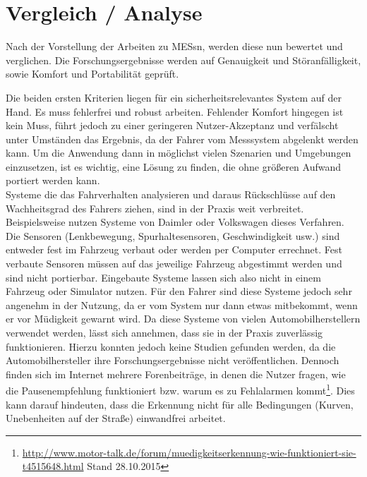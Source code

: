 {\section{Vergleich / Analyse}
\label{chap:an}
Nach der Vorstellung der Arbeiten zu \acl{MESs}n, werden diese nun bewertet und verglichen. Die Forschungsergebnisse werden auf Genauigkeit und Störanfälligkeit, sowie Komfort und Portabilität geprüft. 

Die beiden ersten Kriterien liegen für ein sicherheitsrelevantes System auf der Hand. Es muss fehlerfrei und robust arbeiten. Fehlender Komfort hingegen ist kein Muss, führt jedoch zu einer geringeren Nutzer-Akzeptanz und verfälscht unter Umständen das Ergebnis, da der Fahrer vom Messsystem abgelenkt werden kann. Um die Anwendung dann in möglichst vielen Szenarien und Umgebungen einzusetzen, ist es wichtig, eine Lösung zu finden, die ohne größeren Aufwand portiert werden kann. \\

Systeme die das Fahrverhalten analysieren und daraus Rückschlüsse auf den Wachheitsgrad des Fahrers ziehen, sind in der Praxis weit verbreitet. Beispielsweise nutzen Systeme von Daimler \cite{Daimler} oder Volkswagen \cite{Bosch} dieses Verfahren. Die Sensoren (Lenkbewegung, Spurhaltesensoren, Geschwindigkeit usw.) sind entweder fest im Fahrzeug verbaut oder werden per Computer errechnet. Fest verbaute Sensoren müssen auf das jeweilige Fahrzeug abgestimmt werden und sind nicht portierbar. Eingebaute Systeme lassen sich also nicht in einem Fahrzeug oder Simulator nutzen. Für den Fahrer sind diese Systeme jedoch sehr angenehm in der Nutzung, da er vom System nur dann etwas mitbekommt, wenn er vor Müdigkeit gewarnt wird. Da diese Systeme von vielen Automobilherstellern verwendet werden, lässt sich annehmen, dass sie in der Praxis zuverlässig funktionieren. Hierzu konnten jedoch keine Studien gefunden werden, da die Automobilhersteller ihre Forschungsergebnisse nicht veröffentlichen. Dennoch finden sich im Internet mehrere Forenbeiträge, in denen die Nutzer fragen, wie die Pausenempfehlung funktioniert bzw. warum es zu Fehlalarmen kommt\footnote{\url{http://www.motor-talk.de/forum/muedigkeitserkennung-wie-funktioniert-sie-t4515648.html} Stand 28.10.2015}. Dies kann darauf hindeuten, dass die Erkennung nicht für alle Bedingungen (Kurven, Unebenheiten auf der Straße) einwandfrei arbeitet. \\

}
